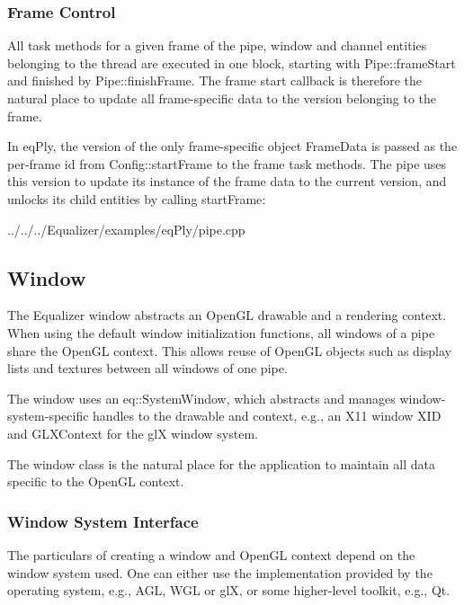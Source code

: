 \documentclass[10pt,a4]{scrartcl}
\begin{document}
\subsubsection{Frame Control}

All task methods for a given frame of the pipe, window and channel
entities belonging to the thread are executed in one block, starting
with \textsf{Pipe::frameStart} and finished by
\textsf{Pipe::finishFrame}. The frame start callback is therefore the
natural place to update all frame-specific data to the version belonging
to the frame. 

In \textsf{eqPly}, the version of the only frame-specific object
\textsf{FrameData} is passed as the per-frame id from
\textsf{Config::startFrame} to the frame task methods. The pipe uses
this version to update its instance of the frame data to the current
version, and unlocks its child entities by calling
\textsf{startFrame}:

{\footnotesize
  {../../../Equalizer/examples/eqPly/pipe.cpp}}


\subsection{\label{sEqplyWIndow}Window}

The Equalizer window abstracts an OpenGL drawable and a rendering
context. When using the default window initialization functions, all
windows of a pipe share the OpenGL context. This allows reuse of OpenGL
objects such as display lists and textures between all windows of one
pipe.

The window uses an \textsf{eq::SystemWindow}, which abstracts and manages
window-system-specific handles to the drawable and context, e.g., an X11 window
\textsf{XID} and \textsf{GLXContext} for the glX window system.

The window class is the natural place for the application to maintain
all data specific to the OpenGL context.

\subsubsection{Window System Interface}

The particulars of creating a window and OpenGL context depend on the
window system used. One can either use the implementation provided by
the operating system, e.g., AGL, WGL or glX, or some higher-level
toolkit, e.g., Qt.
\end{document}

